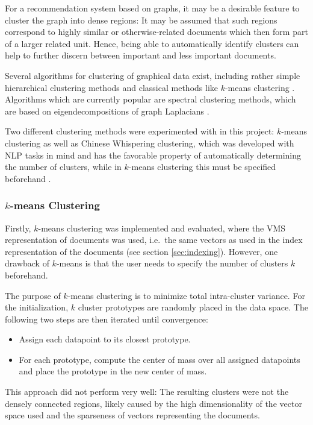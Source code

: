 For a recommendation system based on graphs, it may be a desirable feature to cluster the graph into
dense regions: It may be assumed that such regions correspond to highly similar or otherwise-related
documents which then form part of a larger related unit. Hence, being able to
automatically identify clusters can help to further discern between important and less important
documents.

Several algorithms for clustering of graphical data exist, including rather simple
hierarchical clustering methods and classical methods like $k$-means clustering
\cite{eosl2}. Algorithms which are currently popular are spectral clustering
methods, which are based on eigendecompositions of graph Laplacians \cite{spectral_clustering}.

Two different clustering methods were experimented with in this project: $k$-means clustering
as well as Chinese Whispering clustering, which was developed with NLP tasks in mind and has the
favorable property of automatically determining the number of clusters, while in $k$-means clustering this must be specified beforehand \cite{cw_clustering}.

\subsubsection{$k$-means Clustering}
\label{sec:k-means_clustering}
Firstly, $k$-means clustering was implemented and evaluated, where the VMS representation of
documents was used, i.e.\ the same vectors as used in the index representation of the documents (see
section \ref{sec:indexing}). However, one drawback of $k$-means is that the user needs to specify
the number of clusters $k$ beforehand.

The purpose of $k$-means clustering is to minimize total intra-cluster variance. For the
initialization, $k$ cluster prototypes are randomly placed in the data space. The following two
steps are then iterated until convergence:
\begin{itemize}
  \item Assign each datapoint to its closest prototype.
  \item For each prototype, compute the center of mass over all assigned datapoints and place the
prototype in the new center of mass.
\end{itemize}

This approach did not perform very well: The resulting clusters were not the densely connected
regions, likely caused by the high dimensionality of the vector space used
and the sparseness of vectors representing the documents.

